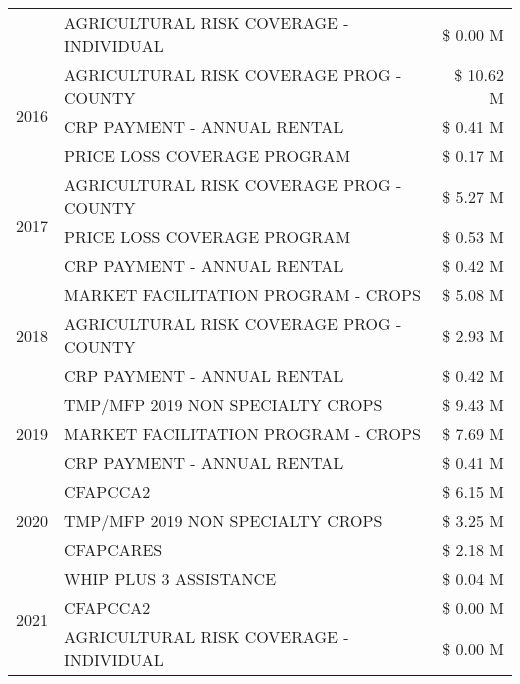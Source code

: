 \begin{tabular}{llr}
 & AGRICULTURAL RISK COVERAGE - INDIVIDUAL & \$ 0.00 M \\
\cline{1-3}
\multirow[t]{3}{*}{2016} & AGRICULTURAL RISK COVERAGE PROG - COUNTY & \$ 10.62 M \\
 & CRP PAYMENT - ANNUAL RENTAL & \$ 0.41 M \\
 & PRICE LOSS COVERAGE PROGRAM & \$ 0.17 M \\
\cline{1-3}
\multirow[t]{3}{*}{2017} & AGRICULTURAL RISK COVERAGE PROG - COUNTY & \$ 5.27 M \\
 & PRICE LOSS COVERAGE PROGRAM & \$ 0.53 M \\
 & CRP PAYMENT - ANNUAL RENTAL & \$ 0.42 M \\
\cline{1-3}
\multirow[t]{3}{*}{2018} & MARKET FACILITATION PROGRAM - CROPS & \$ 5.08 M \\
 & AGRICULTURAL RISK COVERAGE PROG - COUNTY & \$ 2.93 M \\
 & CRP PAYMENT - ANNUAL RENTAL & \$ 0.42 M \\
\cline{1-3}
\multirow[t]{3}{*}{2019} & TMP/MFP 2019 NON SPECIALTY CROPS & \$ 9.43 M \\
 & MARKET FACILITATION PROGRAM - CROPS & \$ 7.69 M \\
 & CRP PAYMENT - ANNUAL RENTAL & \$ 0.41 M \\
\cline{1-3}
\multirow[t]{3}{*}{2020} & CFAPCCA2 & \$ 6.15 M \\
 & TMP/MFP 2019 NON SPECIALTY CROPS & \$ 3.25 M \\
 & CFAPCARES & \$ 2.18 M \\
\cline{1-3}
\multirow[t]{3}{*}{2021} & WHIP PLUS 3 ASSISTANCE & \$ 0.04 M \\
 & CFAPCCA2 & \$ 0.00 M \\
 & AGRICULTURAL RISK COVERAGE - INDIVIDUAL & \$ 0.00 M \\
\cline{1-3}
\bottomrule
\end{tabular}
